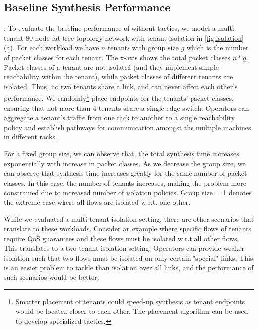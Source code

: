\subsection{Baseline Synthesis Performance} \label{sec:baselineeval} 
: To evaluate the baseline
performance of \Name without tactics, we model a multi-tenant 80-node
fat-tree topology network with tenant-isolation in
\cref{fig:isolation}(a).  For each workload we have $n$ tenants with
group size $g$ which is the number of packet classes for each
tenant. The x-axis shows the total packet classes $n*g$.  Packet
classes of a tenant are not isolated (and they implement simple
reachability within the tenant), while packet classes of different
tenants are isolated. Thus, no two tenants share a link, and can never
affect each other's performance.  We randomly\footnote{ Smarter
  placement of tenants could speed-up synthesis as tenant endpoints
  would be located closer to each other. The placement algorithm can
  be used to develop specialized tactics.}  place endpoints for the
tenants' packet classes, ensuring that not more than 4 tenants share a
single edge switch.  Operators can aggregate a tenant's traffic from
one rack to another to a single reachability policy and establish
pathways for communication amongst the multiple machines in different
racks.

For a fixed group size, we can observe that, the total synthesis time
increases exponentially with increase in packet classes.  As we
decrease the group size, we can observe that synthesis time increases
greatly for the same number of packet classes.  In this case, the
number of tenants increases, making the problem more constrained due
to increased number of isolation policies.  Group size = 1 denotes the
extreme case where all flows are isolated w.r.t. one other.
 
While we evaluated a multi-tenant isolation setting, there are other
scenarios that translate to these workloads. Consider an example where
specific flows of tenants require QoS guarantees and these flows must
be isolated w.r.t all other flows. This translates to a two-tenant
isolation setting. Operators can provide weaker isolation such that
two flows must be isolated on only certain "special" links. 
This is an easier problem to tackle than isolation over all
links, and the performance of such scenarios would be better.

